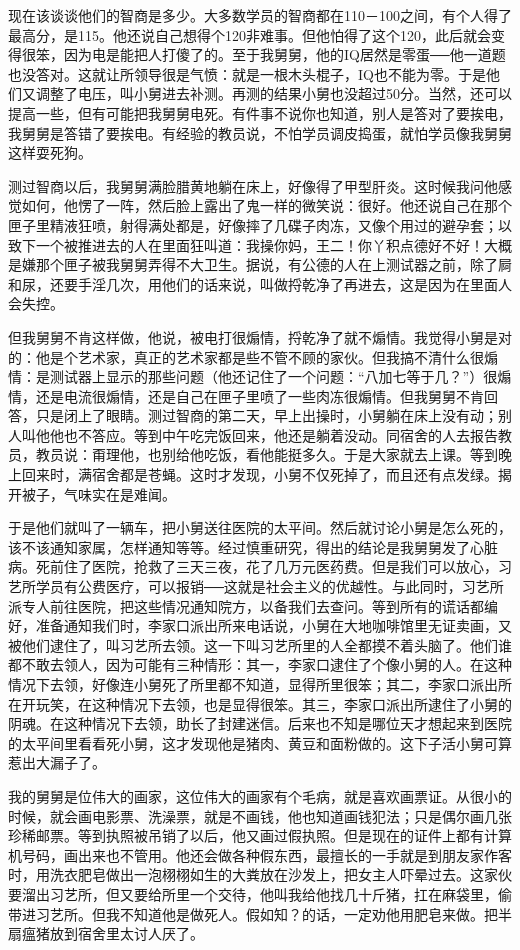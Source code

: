 现在该谈谈他们的智商是多少。大多数学员的智商都在110－100之间，有个人得了最高分，是115。他还说自己想得个120非难事。但他怕得了这个120，此后就会变得很笨，因为电是能把人打傻了的。至于我舅舅，他的IQ居然是零蛋──他一道题也没答对。这就让所领导很是气愤：就是一根木头棍子，IQ也不能为零。于是他们又调整了电压，叫小舅进去补测。再测的结果小舅也没超过50分。当然，还可以提高一些，但有可能把我舅舅电死。有件事不说你也知道，别人是答对了要挨电，我舅舅是答错了要挨电。有经验的教员说，不怕学员调皮捣蛋，就怕学员像我舅舅这样耍死狗。 

测过智商以后，我舅舅满脸腊黄地躺在床上，好像得了甲型肝炎。这时候我问他感觉如何，他愣了一阵，然后脸上露出了鬼一样的微笑说：很好。他还说自己在那个匣子里精液狂喷，射得满处都是，好像摔了几碟子肉冻，又像个用过的避孕套；以致下一个被推进去的人在里面狂叫道：我操你妈，王二！你丫积点德好不好！大概是嫌那个匣子被我舅舅弄得不大卫生。据说，有公德的人在上测试器之前，除了屙和尿，还要手淫几次，用他们的话来说，叫做捋乾净了再进去，这是因为在里面人会失控。 

但我舅舅不肯这样做，他说，被电打很煽情，捋乾净了就不煽情。我觉得小舅是对的：他是个艺术家，真正的艺术家都是些不管不顾的家伙。但我搞不清什么很煽情：是测试器上显示的那些问题（他还记住了一个问题：“八加七等于几？”）很煽情，还是电流很煽情，还是自己在匣子里喷了一些肉冻很煽情。但我舅舅不肯回答，只是闭上了眼睛。测过智商的第二天，早上出操时，小舅躺在床上没有动；别人叫他他也不答应。等到中午吃完饭回来，他还是躺着没动。同宿舍的人去报告教员，教员说：甭理他，也别给他吃饭，看他能挺多久。于是大家就去上课。等到晚上回来时，满宿舍都是苍蝇。这时才发现，小舅不仅死掉了，而且还有点发绿。揭开被子，气味实在是难闻。 

于是他们就叫了一辆车，把小舅送往医院的太平间。然后就讨论小舅是怎么死的，该不该通知家属，怎样通知等等。经过慎重研究，得出的结论是我舅舅发了心脏病。死前住了医院，抢救了三天三夜，花了几万元医药费。但是我们可以放心，习艺所学员有公费医疗，可以报销──这就是社会主义的优越性。与此同时，习艺所派专人前往医院，把这些情况通知院方，以备我们去查问。等到所有的谎话都编好，准备通知我们时，李家口派出所来电话说，小舅在大地咖啡馆里无证卖画，又被他们逮住了，叫习艺所去领。这一下叫习艺所里的人全都摸不着头脑了。他们谁都不敢去领人，因为可能有三种情形：其一，李家口逮住了个像小舅的人。在这种情况下去领，好像连小舅死了所里都不知道，显得所里很笨；其二，李家口派出所在开玩笑，在这种情况下去领，也是显得很笨。其三，李家口派出所逮住了小舅的阴魂。在这种情况下去领，助长了封建迷信。后来也不知是哪位天才想起来到医院的太平间里看看死小舅，这才发现他是猪肉、黄豆和面粉做的。这下子活小舅可算惹出大漏子了。 

我的舅舅是位伟大的画家，这位伟大的画家有个毛病，就是喜欢画票证。从很小的时候，就会画电影票、洗澡票，就是不画钱，他也知道画钱犯法；只是偶尔画几张珍稀邮票。等到执照被吊销了以后，他又画过假执照。但是现在的证件上都有计算机号码，画出来也不管用。他还会做各种假东西，最擅长的一手就是到朋友家作客时，用洗衣肥皂做出一泡栩栩如生的大粪放在沙发上，把女主人吓晕过去。这家伙要溜出习艺所，但又要给所里一个交待，他叫我给他找几十斤猪，扛在麻袋里，偷带进习艺所。但我不知道他是做死人。假如知？的话，一定劝他用肥皂来做。把半扇瘟猪放到宿舍里太讨人厌了。 

